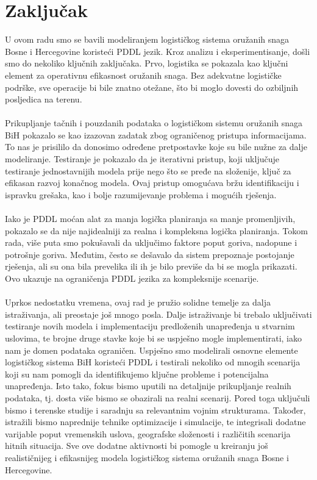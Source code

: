 \documentclass{article}
\begin{document}
\section{Zaključak}
U ovom radu smo se bavili modeliranjem logističkog sistema oružanih snaga Bosne i Hercegovine koristeći PDDL jezik. Kroz analizu i eksperimentisanje, došli smo do nekoliko ključnih zaključaka. Prvo, logistika se pokazala kao ključni element za operativnu efikasnost oružanih snaga. Bez adekvatne logističke podrške, sve operacije bi bile znatno otežane, što bi moglo dovesti do ozbiljnih posljedica na terenu.\\\\
Prikupljanje tačnih i pouzdanih podataka o logističkom sistemu oružanih snaga BiH pokazalo se kao izazovan zadatak zbog ograničenog pristupa informacijama. To nas je prisililo da donosimo određene pretpostavke koje su bile nužne za dalje modeliranje. Testiranje je pokazalo da je iterativni pristup, koji uključuje testiranje jednostavnijih modela prije nego što se pređe na složenije, ključ za efikasan razvoj konačnog modela. Ovaj pristup omogućava bržu identifikaciju i ispravku grešaka, kao i bolje razumijevanje problema i mogućih rješenja. 
\\\\
Iako je PDDL moćan alat za manja logička planiranja sa manje promenljivih, pokazalo se da nije najidealniji za realna i kompleksna logička planiranja. Tokom rada, više puta smo pokušavali da uključimo faktore poput goriva, nadopune i potrošnje goriva. Međutim, često se dešavalo da sistem prepoznaje postojanje rješenja, ali su ona bila prevelika ili ih je bilo previše da bi se mogla prikazati. Ovo ukazuje na ograničenja PDDL jezika za kompleksnije scenarije.\\\\
Uprkos nedostatku vremena, ovaj rad je pružio solidne temelje za dalja istraživanja, ali preostaje još mnogo posla. Dalje istraživanje bi trebalo uključivati testiranje novih modela i implementaciju predloženih unapređenja u stvarnim uslovima, te brojne druge stavke koje bi se uspješno mogle implementirati, iako nam je domen podataka ograničen. Uspješno smo modelirali osnovne elemente logističkog sistema BiH koristeći PDDL i testirali nekoliko od mnogih scenarija koji su nam pomogli da identifikujemo ključne probleme i potencijalna unapređenja. Isto tako, fokus bismo uputili na detaljnije prikupljanje realnih podataka, tj. dosta više bismo se obazirali na realni scenarij. Pored toga uključuli bismo i terenske studije i saradnju sa relevantnim vojnim strukturama. Također, istražili bismo naprednije tehnike optimizacije i simulacije, te integrisali dodatne varijable poput vremenskih uslova, geografske složenosti i različitih scenarija hitnih situacija. Sve ove dodatne aktivnosti bi pomogle u kreiranju još realističnijeg i efikasnijeg modela logističkog sistema oružanih snaga Bosne i Hercegovine.
\end{document}
